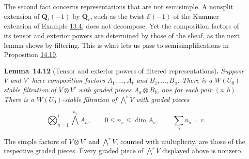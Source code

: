\documentclass[11pt]{article}
\newenvironment{bpstatement}[2]{\par\addvspace{0.6\baselineskip}\noindent\textbf{#1}#2\textbf{.}\enspace\ignorespaces}
  {\par\addvspace{0.4\baselineskip}}
\newenvironment{bpstatementit}[2]{\begin{bpstatement}{#1}{#2}\itshape\ignorespaces}{\end{bpstatement}}
\begin{document}
\label{bp77}%
The second fact concerns representations that are not semisimple. A nonsplit extension of \(\overline{\mathbf Q}_\ell(-1)\) by \(\overline{\mathbf Q}_\ell\), such as the twist \(\mathcal E(-1)\) of the Kummer extension of Example \hyperref[bp17]{13.4}, does not decompose. Yet the composition factors of its tensor and exterior powers are determined by those of the sheaf, as the next lemma shows by filtering. This is what lets us pass to semisimplifications in Proposition \hyperref[bp99]{14.19}.

\label{bp78}%
\begin{bpstatementit}{Lemma~14.12}{ (Tensor and exterior powers of filtered representations)}
Suppose \(V\) and \(V'\) have composition factors \(A_1,\ldots,A_t\) and \(B_1,\ldots,B_u\). There is a \(W(U_0)\)-stable filtration of \(V\otimes V'\) with graded pieces \(A_a\otimes B_b\), one for each pair \((a,b)\). There is a \(W(U_0)\)-stable filtration of \(\bigwedge^rV\) with graded pieces

\[
\bigotimes_{a=1}^t\bigwedge^{n_a}A_a,
\qquad 0\le n_a\le\dim A_a,\qquad\sum_an_a=r.
\]

The simple factors of \(V\otimes V'\) and \(\bigwedge^rV\), counted with multiplicity, are those of the respective graded pieces. Every graded piece of \(\bigwedge^rV\) displayed above is nonzero.
\end{bpstatementit}
\end{document}
